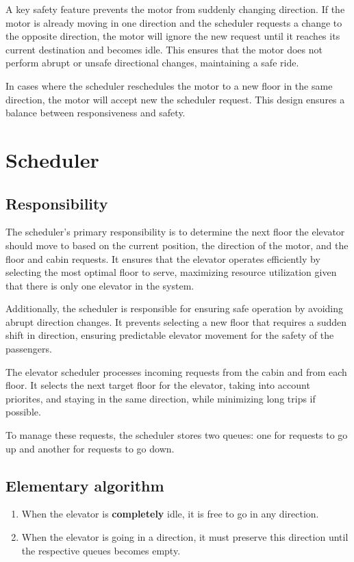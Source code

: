 \documentclass[12pt, a4paper]{report}
\begin{document}
A key safety feature prevents the motor from suddenly changing direction. If the motor is already moving in one direction and the scheduler requests a change to the opposite direction, the motor will ignore the new request until it reaches its current destination and becomes idle. This ensures that the motor does not perform abrupt or unsafe directional changes, maintaining a safe ride.

In cases where the scheduler reschedules the motor to a new floor in the same direction, the motor will accept new the scheduler request. This design ensures a balance between responsiveness and safety.

\chapter{Scheduler}

\section{Responsibility}

The scheduler's primary responsibility is to determine the next floor the elevator should move to based on the current position, the direction of the motor, and the floor and cabin requests. It ensures that the elevator operates efficiently by selecting the most optimal floor to serve, maximizing resource utilization given that there is only one elevator in the system.

Additionally, the scheduler is responsible for ensuring safe operation by avoiding abrupt direction changes. It prevents selecting a new floor that requires a sudden shift in direction, ensuring predictable elevator movement for the safety of the passengers.

The elevator scheduler processes incoming requests from the cabin and from each floor. It selects the next target floor for the elevator, taking into account priorites, and staying in the same direction, while minimizing long trips if possible.

To manage these requests, the scheduler stores two queues: one for requests to go up and another for requests to go down.

\section{Elementary algorithm}
\begin{enumerate}
    \item When the elevator is \textbf{completely} idle, it is free to go in any direction.
    \item When the elevator is going in a direction, it must preserve this direction until the respective queues becomes empty.
\end{enumerate}
\end{document}
